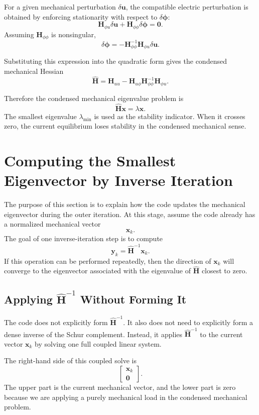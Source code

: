 \documentclass[11pt]{article}
\begin{document}
For a given mechanical perturbation \(\delta \bm u\), the compatible
electric perturbation is obtained by enforcing stationarity with respect
to \(\delta \bm \phi\):
\[
    \bm H_{\phi u}\delta \bm u
    +
    \bm H_{\phi\phi}\delta \bm \phi
    =
    \bm 0.
\]
Assuming \(\bm H_{\phi\phi}\) is nonsingular,
\[
    \delta \bm \phi
    =
    -\bm H_{\phi\phi}^{-1}\bm H_{\phi u}\delta \bm u.
\]

Substituting this expression into the quadratic form gives the condensed
mechanical Hessian
\[
    \widehat{\bm H}
    =
    \bm H_{uu}
    -
    \bm H_{u\phi}
    \bm H_{\phi\phi}^{-1}
    \bm H_{\phi u}.
\]

Therefore the condensed mechanical eigenvalue problem is
\[
    \widehat{\bm H}\bm x = \lambda \bm x.
\]
The smallest eigenvalue \(\lambda_{\min}\) is used as the stability
indicator. When it crosses zero, the current equilibrium loses stability
in the condensed mechanical sense.

\section{Computing the Smallest Eigenvector by Inverse Iteration}

The purpose of this section is to explain how the code updates the
mechanical eigenvector during the outer iteration. At this stage, assume
the code already has a normalized mechanical vector
\[
    \bm x_k.
\]
The goal of one inverse-iteration step is to compute
\[
    \bm y_k = \widehat{\bm H}^{-1}\bm x_k.
\]
If this operation can be performed repeatedly, then the direction of
\(\bm x_k\) will converge to the eigenvector associated with the
eigenvalue of \(\widehat{\bm H}\) closest to zero.

\subsection*{Applying \(\widehat{\bm H}^{-1}\) Without Forming It}

The code does not explicitly form \(\widehat{\bm H}^{-1}\). It also does
not need to explicitly form a dense inverse of the Schur complement.
Instead, it applies \(\widehat{\bm H}^{-1}\) to the current vector
\(\bm x_k\) by solving one full coupled linear system.

The right-hand side of this coupled solve is
\[
    \begin{bmatrix}
        \bm x_k \\
        \bm 0
    \end{bmatrix}.
\]
The upper part is the current mechanical vector, and the lower part is
zero because we are applying a purely mechanical load in the condensed
mechanical problem.
\end{document}
